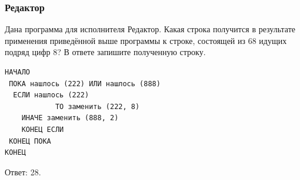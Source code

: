 \begin{frame}[fragile]
\frametitle{Редактор}
Дана программа для исполнителя Редактор. Какая строка получится в результате применения приведённой выше программы к строке, состоящей из 68 идущих подряд цифр 8? В ответе запишите полученную строку. 
\small
\begin{verbatim}
НАЧАЛО
 ПОКА нашлось (222) ИЛИ нашлось (888)
  ЕСЛИ нашлось (222)
			ТО заменить (222, 8)
	ИНАЧЕ заменить (888, 2)
	КОНЕЦ ЕСЛИ
 КОНЕЦ ПОКА
КОНЕЦ
\end{verbatim}
\normalsize
\pause Ответ:  28.
\end{frame}